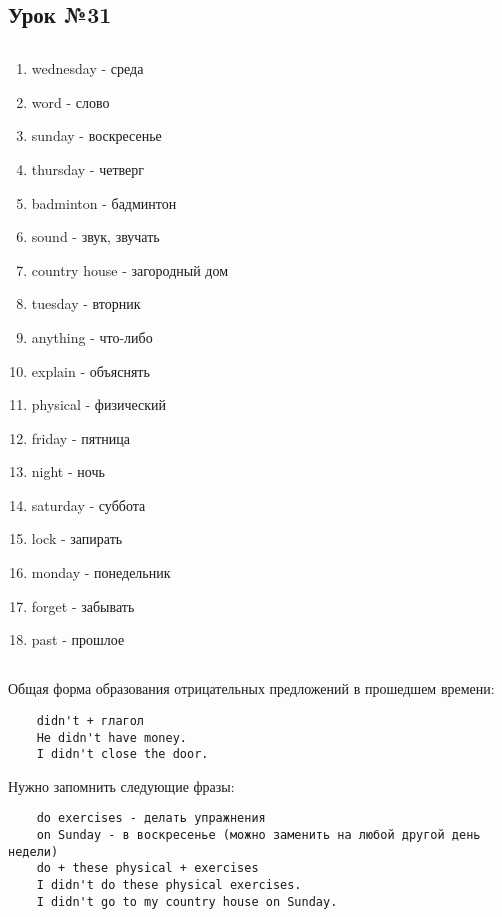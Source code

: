 \subsection{Урок №31}

\subsection*{}
\begin{multicols}{2}
    \begin{enumerate}\setlength{\itemsep}{0pt}
        \item wednesday - среда
        \item word - слово
        \item sunday - воскресенье
        \item thursday - четверг
        \item badminton - бадминтон
        \item sound - звук, звучать
        \item country house - загородный дом
        \item tuesday - вторник
        \item anything - что-либо
        \item explain - объяснять
        \item physical - физический
        \item friday - пятница
        \item night - ночь
        \item saturday - суббота
        \item lock - запирать
        \item monday - понедельник
        \item forget - забывать
        \item past - прошлое
    \end{enumerate}
\end{multicols}

\subsection*{}
Общая форма образования отрицательных предложений в прошедшем времени:
\begin{verbatim}
    didn't + глагол
    He didn't have money.
    I didn't close the door.
\end{verbatim}

Нужно запомнить следующие фразы:
\begin{verbatim}
    do exercises - делать упражнения
    on Sunday - в воскресенье (можно заменить на любой другой день недели)
    do + these physical + exercises
    I didn't do these physical exercises.
    I didn't go to my country house on Sunday.
\end{verbatim}